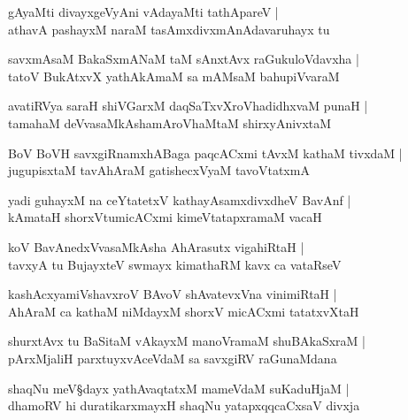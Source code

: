\begin{shloka}
gAyaMti divayxgeVyAni vAdayaMti tathApareV |\\
athavA pashayxM naraM tasAmxdivxmAnAdavaruhayx tu
\end{shloka}

\begin{shloka}
savxmAsaM BakaSxmANaM taM sAnxtAvx raGukuloVdavxha |\\
tatoV BukAtxvX yathAkAmaM sa mAMsaM bahupiVvaraM 
\end{shloka}

\begin{shloka}
avatiRVya saraH shiVGarxM daqSaTxvXroVhadidhxvaM punaH |\\
tamahaM deVvasaMkAshamAroVhaMtaM shirxyAnivxtaM 
\end{shloka}

\begin{shloka}
BoV BoVH savxgiRnamxhABaga paqcACxmi tAvxM kathaM tivxdaM |\\
jugupisxtaM tavAhAraM gatishecxVyaM tavoVtatxmA 
\end{shloka}

\begin{shloka}
yadi guhayxM na ceYtatetxV kathayAsamxdivxdheV BavAnf |\\
kAmataH shorxVtumicACxmi kimeVtatapxramaM vacaH 
\end{shloka}

\begin{shloka}
koV BavAnedxVvasaMkAsha AhArasutx vigahiRtaH |\\
tavxyA tu BujayxteV swmayx kimathaRM kavx ca vataRseV
\end{shloka}

\begin{shloka}
kashAcxyamiVshavxroV BAvoV shAvatevxVna vinimiRtaH |\\
AhAraM ca kathaM niMdayxM shorxV micACxmi tatatxvXtaH 
\end{shloka}

\begin{shloka}
shurxtAvx tu BaSitaM vAkayxM manoVramaM shuBAkaSxraM |\\
pArxMjaliH parxtuyxvAceVdaM sa savxgiRV raGunaMdana
\end{shloka}

\begin{shloka}
shaqNu meV\S dayx yathAvaqtatxM mameVdaM suKaduHjaM |\\
dhamoRV hi duratikarxmayxH shaqNu yatapxqqcaCxsaV divxja 
\end{shloka}

